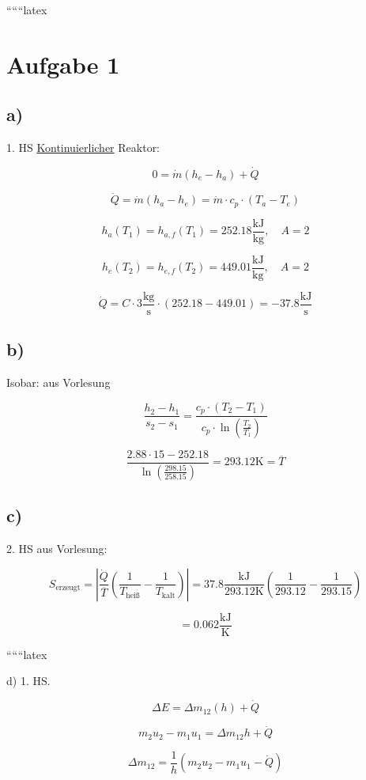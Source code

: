 
``````latex


\section*{Aufgabe 1}

\subsection*{a)}
1. HS \underline{Kontinuierlicher} Reaktor:

\[
0 = \dot{m}(h_e - h_a) + \dot{Q}
\]

\[
\dot{Q} = \dot{m}(h_a - h_e) = \dot{m} \cdot c_p \cdot (T_a - T_e)
\]

\[
h_a(T_1) = h_{a,f}(T_1) = 252.18 \frac{\text{kJ}}{\text{kg}}, \quad A = 2
\]

\[
h_e(T_2) = h_{e,f}(T_2) = 449.01 \frac{\text{kJ}}{\text{kg}}, \quad A = 2
\]

\[
\dot{Q} = C \cdot 3 \frac{\text{kg}}{\text{s}} \cdot (252.18 - 449.01) = -37.8 \frac{\text{kJ}}{\text{s}}
\]

\subsection*{b)}
Isobar: aus Vorlesung

\[
\frac{h_2 - h_1}{s_2 - s_1} = \frac{c_p \cdot (T_2 - T_1)}{c_p \cdot \ln \left( \frac{T_2}{T_1} \right)}
\]

\[
\frac{2.88 \cdot 15 - 252.18}{\ln \left( \frac{298.15}{258.15} \right)} = 293.12 \text{K} = \overline{T}
\]

\subsection*{c)}
2. HS aus Vorlesung:

\[
S_{\text{erzeugt}} = \left| \frac{\dot{Q}}{\overline{T}} \left( \frac{1}{T_{\text{heiß}}} - \frac{1}{T_{\text{kalt}}} \right) \right| = 37.8 \frac{\text{kJ}}{293.12 \text{K}} \left( \frac{1}{293.12} - \frac{1}{293.15} \right)
\]

\[
= 0.062 \frac{\text{kJ}}{\text{K}}
\]

``````latex


d) 1. HS.

\[
\Delta E = \Delta m_{12}(h) + \dot{Q}
\]

\[
m_2 u_2 - m_1 u_1 = \Delta m_{12} h + \dot{Q}
\]

\[
\Delta m_{12} = \frac{1}{h} (m_2 u_2 - m_1 u_1 - \dot{Q})
\]

